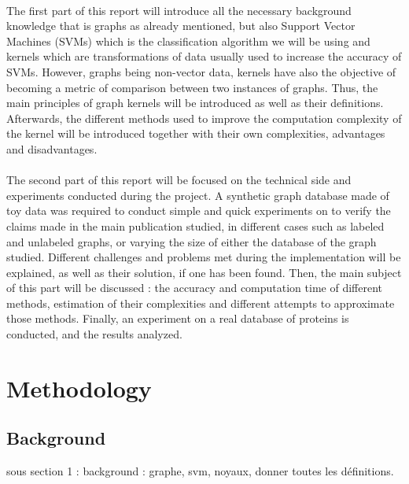 \documentclass{article}
\theoremstyle{definition}
\begin{document}
 \paragraph{}The first part of this report will introduce all the necessary background knowledge that is graphs as already mentioned, but also Support Vector Machines (SVMs) which is the classification algorithm we will be using and kernels which are transformations of data usually used to increase the accuracy of SVMs. However, graphs being non-vector data, kernels have also the objective of becoming a metric of comparison between two instances of graphs. Thus, the main principles of graph kernels will be introduced as well as their definitions. Afterwards, the different methods used to improve the computation complexity of the kernel will be introduced together with their own complexities, advantages and disadvantages.

\paragraph{}The second part of this report will be focused on the technical side and experiments conducted during the project. A synthetic graph database made of toy data was required to conduct simple and quick experiments on to verify the claims made in the main publication studied, in different cases such as labeled and unlabeled graphs, or varying the size of either the database of the graph studied. Different challenges and problems met during the implementation will be explained, as well as their solution, if one has been found. Then, the main subject of this part will be discussed : the accuracy and computation time of different methods, estimation of their complexities and different attempts to approximate those methods. Finally, an experiment on a real database of proteins is conducted, and the results analyzed.
 
\section{Methodology}
\subsection{Background}
sous section 1 : background : graphe, svm, noyaux, donner toutes les définitions.
\end{document}
